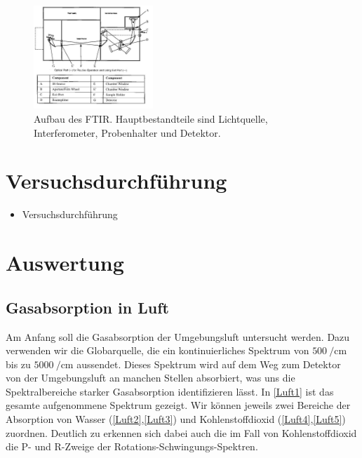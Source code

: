 \documentclass[paper=a4,fontsize=10pt,DIV=18,twocolumn,parskip=half]{scrartcl}
\numberwithin{equation}{section}    %
\begin{document}
\begin{figure}
\centering
    \includegraphics[width=0.4\textwidth]{Bilder/FTIR}
    \caption{Aufbau des FTIR. Hauptbestandteile sind Lichtquelle, 
    Interferometer, Probenhalter und Detektor.}
    \label{ftir}
\end{figure}


\section{Versuchsdurchführung}
\begin{itemize}
\item Versuchsdurchführung
\end{itemize}


\section{Auswertung}

\subsection{Gasabsorption in Luft}
Am Anfang soll die Gasabsorption der Umgebungsluft untersucht werden.  Dazu 
verwenden wir die Globarquelle, die ein kontinuierliches Spektrum von 
$\SI{500}{\per\centi\meter}$ bis zu $\SI{5000}{\per\centi\meter}$ aussendet.  
Dieses Spektrum wird auf dem Weg zum Detektor von der Umgebungsluft an manchen 
Stellen absorbiert, was uns die Spektralbereiche starker Gasabsorption 
identifizieren lässt.
In \cref{Luft1} ist das gesamte aufgenommene Spektrum gezeigt.  Wir können 
jeweils zwei Bereiche der Absorption von Wasser (\cref{Luft2},\cref{Luft3}) und 
Kohlenstoffdioxid (\cref{Luft4},\cref{Luft5}) zuordnen.  Deutlich zu erkennen sich 
dabei auch die im Fall von Kohlenstoffdioxid die P- und R-Zweige der 
Rotations-Schwingungs-Spektren.
\end{document}
